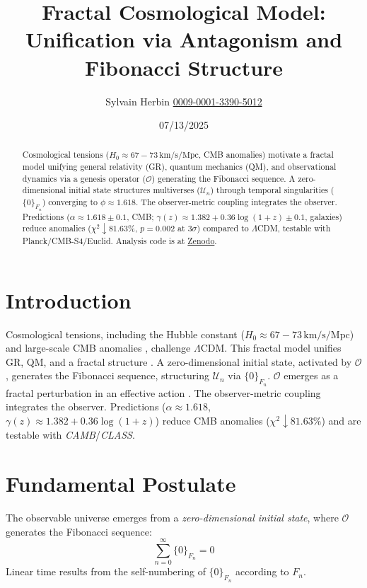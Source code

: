 \documentclass[aps,prl,twocolumn,groupedaddress]{revtex4-2}
\newcommand{\F}[1]{F_{#1}}
\newcommand{\U}[1]{\mathcal{U}_{#1}}
\newcommand{\phiapprox}{\phi \approx 1.618}
\newcommand{\Opp}{\mathcal{O}}
\newcommand{\presets}{\{0\}_{\F{n}}}
\begin{document}
\title{Fractal Cosmological Model: Unification via Antagonism and Fibonacci Structure}
\author{Sylvain Herbin \href{https://orcid.org/0009-0001-3390-5012}{0009-0001-3390-5012}}
\date{07/13/2025}

\begin{abstract}
Cosmological tensions (\(H_0 \approx 67-73 \, \text{km/s/Mpc}\), CMB anomalies) motivate a fractal model unifying general relativity (GR), quantum mechanics (QM), and observational dynamics via a genesis operator (\(\Opp\)) generating the Fibonacci sequence. A zero-dimensional initial state structures multiverses (\(\U{n}\)) through temporal singularities (\(\presets\)) converging to \(\phiapprox\). The observer-metric coupling integrates the observer. Predictions (\(\alpha \approx 1.618 \pm 0.1\), CMB; \(\gamma(z) \approx 1.382 + 0.36 \log(1+z) \pm 0.1\), galaxies) reduce anomalies (\(\chi^2 \downarrow 81.63\%\), \(p = 0.002\) at \(3\sigma\)) compared to \(\Lambda\)CDM, testable with Planck/CMB-S4/Euclid. Analysis code is at \href{https://doi.org/10.5281/zenodo.15863407}{Zenodo}.
\end{abstract}

\maketitle

\section{Introduction}
Cosmological tensions, including the Hubble constant (\(H_0 \approx 67-73 \, \text{km/s/Mpc}\)) \cite{divalentino2021} and large-scale CMB anomalies \cite{planck}, challenge \(\Lambda\)CDM. This fractal model unifies GR, QM, and a fractal structure \cite{nottale}. A zero-dimensional initial state, activated by \(\Opp\), generates the Fibonacci sequence, structuring \(\U{n}\) via \(\presets\). \(\Opp\) emerges as a fractal perturbation in an effective action \cite{chernsimons}. The observer-metric coupling \cite{zeh,zurek} integrates the observer. Predictions (\(\alpha \approx 1.618\), \(\gamma(z) \approx 1.382 + 0.36 \log(1+z)\)) reduce CMB anomalies (\(\chi^2 \downarrow 81.63\%\)) and are testable with \textit{CAMB}/\textit{CLASS}.

\section{Fundamental Postulate}
The observable universe emerges from a \emph{zero-dimensional initial state}, where \(\Opp\) generates the Fibonacci sequence:
\begin{equation}
\sum_{n=0}^\infty \presets = 0
\label{eq:sum_zero}
\end{equation}
Linear time results from the self-numbering of \(\presets\) according to \(\F{n}\).
\end{document}
